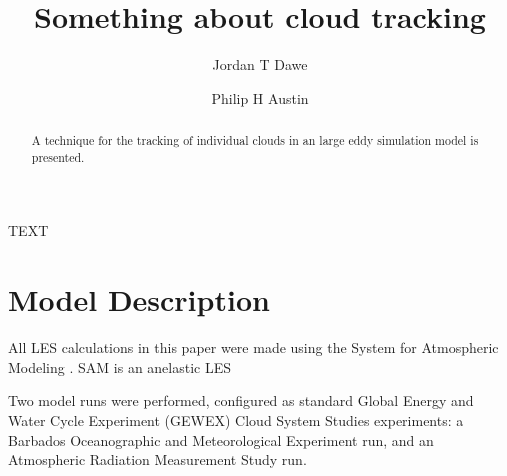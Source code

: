 \documentclass[acp]{copernicus}
\begin{document}
\title{Something about cloud tracking}


\author[1]{Jordan T Dawe}
\author[1]{Philip H Austin}










\received{}
\pubdiscuss{} %
\revised{}
\accepted{}
\published{}




\maketitle



\begin{abstract}
A technique for the tracking of individual clouds in an large eddy 
simulation model is presented.
\end{abstract}





\introduction
TEXT



\section{Model Description}

All LES calculations in this paper were made using the System for Atmospheric 
Modeling \citep[SAM;][]{Khairoutdinov2003}.  SAM is an anelastic LES 

Two model runs were performed, configured as standard Global Energy and Water
Cycle Experiment (GEWEX) Cloud System Studies \citep[GCSS;][]{Randall2003}
experiments: a Barbados Oceanographic and Meteorological Experiment 
\citep[BOMEX;][]{Siebesma2003} run, and an Atmospheric Radiation Measurement
Study \citep[ARM;][]{Brown2002} run. 
\end{document}
